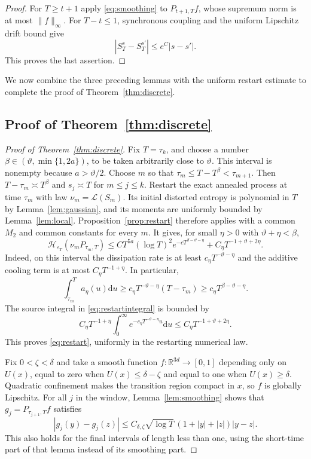 \documentclass[11pt]{article}
\theoremstyle{definition}
\newcommand{\R}{\mathbb R}
\newcommand{\dd}{\mathrm d}
\newcommand{\cH}{\mathcal H}
\newcommand{\eps}{\varepsilon}
\begin{document}
\begin{proof}
For $T\geq t+1$ apply \eqref{eq:smoothing} to
$P_{t+1,T}f$, whose supremum norm is at most $\|f\|_\infty$.
For $T-t\leq1$, synchronous coupling and the uniform Lipschitz drift bound
give 
\[
\left|S_T^s-S_T^{s'}\right|\leq e^C\left|s-s'\right|. 
\]
This proves the last assertion.
\end{proof}

We now combine the three preceding lemmas with the uniform restart estimate to complete
the proof of Theorem~\ref{thm:discrete}.

\subsection{Proof of Theorem~\ref{thm:discrete}}\label{sec:proof_of_theorem_discrete}
\begin{proof}[Proof of Theorem~\ref{thm:discrete}]
Fix $T=\tau_k$, and choose a number
$\beta\in(\vartheta,\min\{1,2a\})$, to be taken arbitrarily close to
$\vartheta$. This interval is nonempty because $a>\vartheta/2$.
Choose $m$ so that $\tau_m\leq T-T^\beta<\tau_{m+1}$. Then
$T-\tau_m\asymp T^\beta$ and $s_j\asymp T$ for $m\leq j\leq k$.
Restart the exact annealed process at time $\tau_m$ with law $\nu_m=\mathcal L(S_m)$.
Its initial distorted entropy is polynomial in $T$ by
Lemma~\ref{lem:gaussian}, and its moments are uniformly bounded by
Lemma~\ref{lem:local}. Proposition~\ref{prop:restart} therefore applies
with a common $M_2$ and common constants for every $m$. It gives, for small
$\eta>0$ with $\vartheta+\eta<\beta$,
\begin{equation}\label{eq:restart}
 \cH_{\eps_T}(\nu_mP_{\tau_m,T})
 \leq C T^{5a}(\log T)^2
             e^{-cT^{\beta-\vartheta-\eta}}
       +C_\eta T^{-1+\vartheta+2\eta}.
\end{equation}
Indeed, on this interval the dissipation rate is at least
$c_\eta T^{-\vartheta-\eta}$ and the additive cooling term is at most
$C_\eta T^{-1+\eta}$. In particular,
\[
 \int_{\tau_m}^T a_\eta(u)\dd u
 \geq c_\eta T^{-\vartheta-\eta}(T-\tau_m)
 \geq c_\eta T^{\beta-\vartheta-\eta}.
\]
The source integral in
\eqref{eq:restartintegral} is bounded by
\[
 C_\eta T^{-1+\eta}\int_0^\infty
          e^{-c_\eta T^{-\vartheta-\eta}u}\dd u
 \leq C_\eta T^{-1+\vartheta+2\eta}.
\]
This proves \eqref{eq:restart}, uniformly in the restarting numerical law.

Fix $0<\zeta<\delta$ and take a smooth function $f:\R^{3d}\to[0,1]$
depending only on $U(x)$, equal to zero when $U(x)\leq\delta-\zeta$ and equal
to one when $U(x)\geq\delta$. Quadratic confinement makes the transition
region compact in $x$, so $f$ is globally Lipschitz. For all $j$ in the window,
Lemma~\ref{lem:smoothing} shows that
$g_j=P_{\tau_{j+1},T}f$ satisfies
\begin{equation}\label{eq:weightedlip}
 |g_j(y)-g_j(z)|
 \leq C_{\delta,\zeta}\sqrt{\log T}\,
              \left(1+|y|+|z|\right)|y-z|.
\end{equation}
This also holds for the final intervals of length less than one, using the
short-time part of that lemma instead of its smoothing part.


\end{proof}
\end{document}
